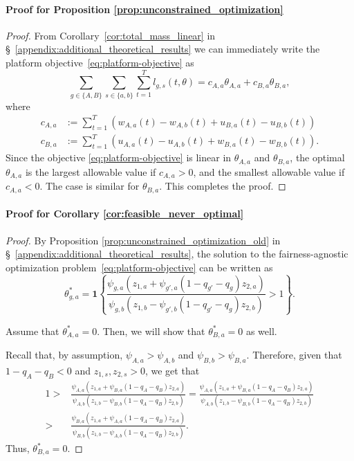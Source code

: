 \documentclass[letterpaper]{article} %
\begin{document}
\paragraph{Proof for Proposition \ref{prop:unconstrained_optimization}}


\begin{proof}
From Corollary~\ref{cor:total_mass_linear} in \S~\ref{appendix:additional_theoretical_results} we can immediately write the platform objective~\eqref{eq:platform-objective} as
\begin{equation*}
    \sum_{g \in \{A,B\}} \sum_{s \in \{ a,b\}} \sum_{t=1}^T l_{g,s}(t,\theta) = c_{A,a} \theta_{A,a} + c_{B,a} \theta_{B,a},
\end{equation*}
where
\begin{align*}
    c_{A,a} &:= \sum_{t=1}^T (w_{A,a}(t) - w_{A,b}(t) + u_{B,a}(t) - u_{B,b}(t)) \\
    c_{B,a} &:= \sum_{t=1}^T (u_{A,a}(t) - u_{A,b}(t) + w_{B,a}(t) - w_{B,b}(t)).
\end{align*}
Since the objective \eqref{eq:platform-objective} is linear in $\theta_{A,a}$ and $\theta_{B,a}$, the optimal $\theta_{A,a}$ is the largest allowable value if $c_{A,a} > 0$, and the smallest allowable value if $c_{A,a} < 0$. The case is similar for $\theta_{B,a}$. This completes the proof.
\end{proof}

\paragraph{Proof for Corollary \ref{cor:feasible_never_optimal}}

\begin{proof}

By Proposition \ref{prop:unconstrained_optimization_old} in \S~\ref{appendix:additional_theoretical_results}, the solution to the fairness-agnostic optimization problem~\eqref{eq:platform-objective} can be written as
\begin{equation*}
\theta^*_{g,a} = \mathbf{1} \left\{ \frac{\psi_{g,a} (z_{1,a} + \psi_{g',a}(1-q_{g'}-q_g) z_{2,a})}{\psi_{g,b} (z_{1,b} - \psi_{g',b}(1-q_{g'}-q_g) z_{2,b})} >1 \right\}.
\end{equation*}

Assume that $\theta_{A,a}^*=0$. Then, we will show that $\theta_{B,a}^*=0$ as well.

Recall that, by assumption, $\psi_{A,a} > \psi_{A,b}$ and $\psi_{B,b} > \psi_{B,a}$.
Therefore, given that $1-q_{A}-q_B <0$ and $z_{1,s}, z_{2,s} >0$, we get that
\begin{align*}
    1>&\frac{\psi_{A,a} (z_{1,a} + \psi_{B,a}(1-q_{A}-q_B) z_{2,a})}{\psi_{A,b} (z_{1,b} - \psi_{B,b}(1-q_{A}-q_B) z_{2,b})} = \frac{\psi_{A,a} (z_{1,a} + \psi_{B,a}(1-q_{A}-q_B) z_{2,a})}{\psi_{A,b} (z_{1,b} - \psi_{B,b}(1-q_{A}-q_B) z_{2,b})}\\
    >& \frac{\psi_{B,a} (z_{1,a} + \psi_{A,a}(1-q_{A}-q_B) z_{2,a})}{\psi_{B,b} (z_{1,b} - \psi_{A,b}(1-q_{A}-q_B) z_{2,b})}.
\end{align*}
Thus, $\theta_{B,a}^* =0$.
\end{proof}
\end{document}
